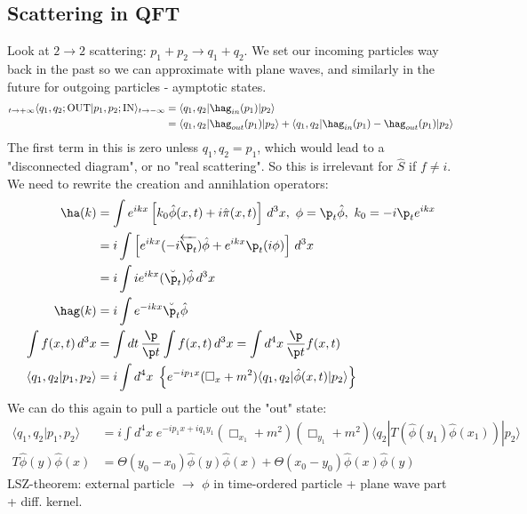 \documentclass[a4paper, 11pt, normalem]{report}
\newcommand\hphi{\hat{\phi}}
\newcommand\hpi{\hat{\pi}}
\begin{document}
\section{Scattering in QFT}
Look at $2\to2$ scattering: $p_1 + p_2 \to q_1 + q_2$.
We set our incoming particles way back in the past so we can approximate with plane waves, and similarly in the future for outgoing particles - aymptotic states.
\begin{align}
    {}_{t\to +\infty}\langle q_1,q_2;\text{OUT}|p_1,p_2;\text{IN}\rangle_{t\to-\infty} &= \langle q_1,q_2|\hag_{in}(p_1)|p_2\rangle \\
                                                                                       &= \langle q_1,q_2|\hag_{out}(p_1)|p_2\rangle + \langle q_1,q_2|\hag_{in}(p_1)-\hag_{out}(p_1)|p_2\rangle
\end{align}
The first term in this is zero unless $q_1,q_2=p_1$, which would lead to a "disconnected diagram", or no "real scattering".
So this is irrelevant for $\hat{S}$ if $f \neq i$.
We need to rewrite the creation and annihlation operators:
\begin{align}
    \ha(k) &= \int e^{ikx}\left[k_0\hphi(x,t) + i\hpi(x,t)\right]\,d^3x,~ \phi = \p_t\hphi,~ k_0 = -i\p_te^{ikx} \\
           &= i\int \left[e^{ikx}(-i\overleftarrow{\p_t})\hphi+e^{ikx}\p_t(i\phi)\right]\,d^3x \\
           &= i\int ie^{ikx}(\breve{\p_t})\hphi\,d^3x \\
    \hag(k) &= i\int e^{-ikx}\breve{\p_t}\hphi \\
    \int f(x,t)\,d^3x &= \int dt\,\frac{\p}{\p t}\int f(x,t)\,d^3x = \int d^4x\,\frac{\p}{\p t}f(x,t) \\
    \langle q_1,q_2|p_1,p_2\rangle &= i\int d^4x\;\left\{e^{-ip_1x}(\Box_x+m^2)\langle q_1,q_2|\hphi(x,t)|p_2\rangle\right\}
\end{align}
We can do this again to pull a particle out the "out" state:
\begin{align}
    \langle q_1,q_2|p_1,p_2\rangle &= i\int d^4x\; e^{-ip_1x+iq_1y_1}(\Box_{x_1}+m^2)(\Box_{y_1}+m^2)\langle q_2|T(\hphi(y_1)\hphi(x_1))|p_2\rangle \\
    T\hphi(y)\hphi(x) &= \Theta(y_0-x_0)\hphi(y)\hphi(x) + \Theta(x_0-y_0)\hphi(x)\hphi(y)
\end{align}
LSZ-theorem: external particle $\to$ $\phi$ in time-ordered particle + plane wave part + diff. kernel.

\chapter{}
\end{document}
